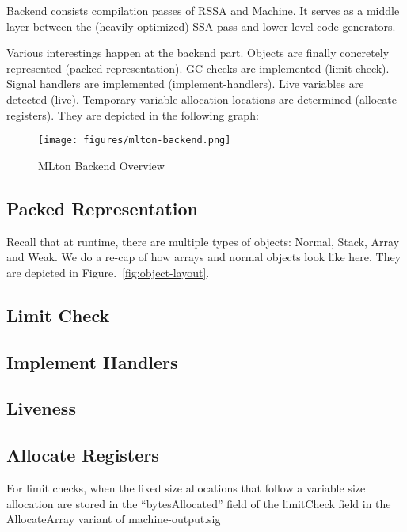 Backend consists compilation passes of RSSA and Machine. It serves as
a middle layer between the (heavily optimized) SSA pass and lower
level code generators.

Various interestings happen at the backend part. Objects are finally
concretely represented (packed-representation). GC checks are
implemented (limit-check). Signal handlers are implemented
(implement-handlers). Live variables are detected (live). Temporary
variable allocation locations are determined
(allocate-registers). They are depicted in the following graph:

\begin{figure}
\centering
\texttt{[image: figures/mlton-backend.png]}
\caption{MLton Backend Overview}
\label{fig:backend-overview}
\end{figure}

\subsection{Packed Representation}
Recall that at runtime, there are multiple types of objects: Normal,
Stack, Array and Weak. We do a re-cap of how arrays and normal objects
look like here. They are depicted in Figure.~\ref{fig:object-layout}.



\subsection{Limit Check}

\subsection{Implement Handlers}

\subsection{Liveness}

\subsection{Allocate Registers}
For limit checks, when the fixed size allocations that follow a variable size
allocation are stored in the ``bytesAllocated'' field of the limitCheck field in
the AllocateArray variant of machine-output.sig
